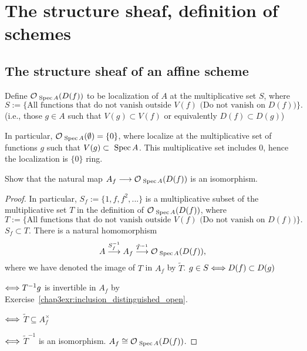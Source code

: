 \chapter{The structure sheaf, definition of schemes}
\section{The structure sheaf of an affine scheme
}
\begin{definition}
Define ${\cal O}_{\text{ Spec\,} A}(D(f))$ to be localization of $A$ at the multiplicative set $S$, where
$$
S:=\{\text{All functions that do not vanish outside $V(f)$ (Do not vanish on $D(f))$}\}.
$$
(i.e., those $g\in A$ such that $V(g)\subset V(f)$ or equivalently $D(f)\subset D(g)$)
\end{definition}
In particular, ${\cal O}_{\text{ Spec\,} A}(\emptyset)=\{0\}$, where localize at the multiplicative set of functions $g$ such that $V(g)\subset \text{ Spec\,} A$. This multiplicative set includes $0$, hence the localization is $\{0\}$ ring.

\begin{exr}\label{chap4exr:4.1.A}
Show that the natural map $A_f \longrightarrow {\cal O}_{\text{ Spec\,} A}(D(f))$ is an isomorphism.
\end{exr}
\begin{proof}
In particular, $S_f:=\{1,f,f^2,...\}$ is a multiplicative subset of the multiplicative set $T$ in the definition of ${\cal O}_{\text{ Spec\,} A}(D(f))$, where 
$$
T:=\{\text{All functions that do not vanish outside $V(f)$ (Do not vanish on $D(f))$}\}.
$$
$S_f\subset T$.
There is a natural homomorphism 
$$
A\overset{S_f^{-1}}{\longrightarrow}A_f\overset{\tilde{T}^{-1}}{\longrightarrow}{\cal O}_{\text{ Spec\,} A}(D(f)), 
$$
where we have denoted the image of $T$ in $A_f$ by $\tilde{T}$. $g\in S\Longleftrightarrow D(f)\subset D(g)$

$\Longleftrightarrow T^{-1}g$ is invertible in $A_f$ by Exercise~\ref{chap3exr:inclusion_distinguished_open}.

$\Longleftrightarrow$ $\tilde{T}\subseteq A_f^\times$

$\Longleftrightarrow$ $\tilde{T}^{-1}$ is an isomorphism. $A_f\cong {\cal O}_{\text{ Spec\,} A}(D(f))$.
\end{proof}

